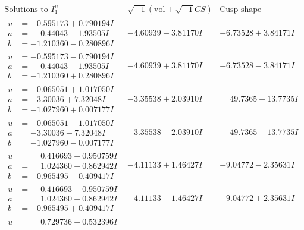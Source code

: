 \documentclass[1p]{elsarticle_modified}
\theoremstyle{definition}
\newcommand{\I}{\sqrt{-1}}
\begin{document}
$$\begin{array}{c|c|c}  
\text{Solutions to }I^u_{1}& \I (\text{vol} + \sqrt{-1}CS) & \text{Cusp shape}\\
 \hline 
\begin{aligned}
u &= -0.595173 + 0.790194 I \\
a &= \phantom{-}0.44043 + 1.93505 I \\
b &= -1.210360 - 0.280896 I\end{aligned}
 & -4.60939 - 3.81170 I & -6.73528 + 3.84171 I \\ \hline\begin{aligned}
u &= -0.595173 - 0.790194 I \\
a &= \phantom{-}0.44043 - 1.93505 I \\
b &= -1.210360 + 0.280896 I\end{aligned}
 & -4.60939 + 3.81170 I & -6.73528 - 3.84171 I \\ \hline\begin{aligned}
u &= -0.065051 + 1.017050 I \\
a &= -3.30036 + 7.32048 I \\
b &= -1.027960 + 0.007177 I\end{aligned}
 & -3.35538 + 2.03910 I & \phantom{-}49.7365 + 13.7735 I \\ \hline\begin{aligned}
u &= -0.065051 - 1.017050 I \\
a &= -3.30036 - 7.32048 I \\
b &= -1.027960 - 0.007177 I\end{aligned}
 & -3.35538 - 2.03910 I & \phantom{-}49.7365 - 13.7735 I \\ \hline\begin{aligned}
u &= \phantom{-}0.416693 + 0.950759 I \\
a &= \phantom{-}1.024360 + 0.862942 I \\
b &= -0.965495 - 0.409417 I\end{aligned}
 & -4.11133 + 1.46427 I & -9.04772 - 2.35631 I \\ \hline\begin{aligned}
u &= \phantom{-}0.416693 - 0.950759 I \\
a &= \phantom{-}1.024360 - 0.862942 I \\
b &= -0.965495 + 0.409417 I\end{aligned}
 & -4.11133 - 1.46427 I & -9.04772 + 2.35631 I \\ \hline\begin{aligned}
u &= \phantom{-}0.729736 + 0.532396 I \\

\end{aligned}
\end{array}$$
\end{document}
